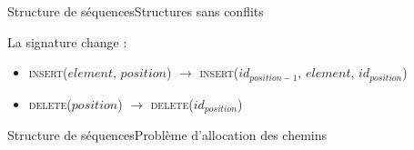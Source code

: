 \begin{frame}{Structure de séquences}{Structures sans conflits}
  
  La signature change : 
  \begin{itemize}
  \item \textsc{insert}($element,\, position$) $\rightarrow$
    \textsc{insert}($id_{position-1},\, element,\, id_{position}$)
  \item \textsc{delete}($position$) $\rightarrow$ \textsc{delete}($id_{position}$)
  \end{itemize}

  \vspace{0.5cm}
  

  \begin{algorithm}[H]
    
  \end{algorithm}

\end{frame}


\begin{frame}{Structure de séquences}{Problème d'allocation des chemins}

\end{frame}